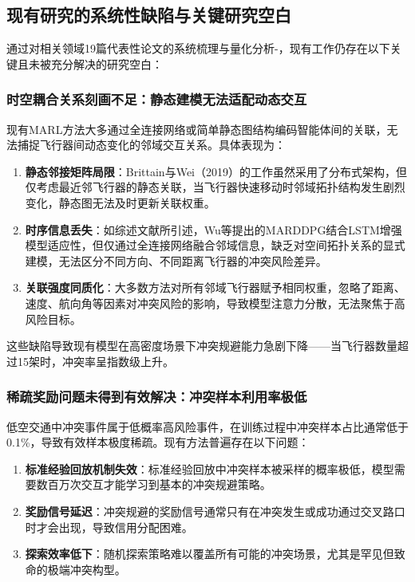 \documentclass[12pt,a4paper,UTF8]{ctexart}
\begin{document}
\subsection{现有研究的系统性缺陷与关键研究空白}
通过对相关领域19篇代表性论文的系统梳理与量化分析\cite{ref1}-\cite{ref19}，现有工作仍存在以下关键且未被充分解决的研究空白：

\subsubsection{时空耦合关系刻画不足：静态建模无法适配动态交互}
现有MARL方法大多通过全连接网络或简单静态图结构编码智能体间的关联，无法捕捉飞行器间动态变化的邻域交互关系。具体表现为：
\begin{enumerate}[label=(\arabic*)]
    \item \textbf{静态邻接矩阵局限}：Brittain与Wei（2019）的工作虽然采用了分布式架构，但仅考虑最近邻飞行器的静态关联，当飞行器快速移动时邻域拓扑结构发生剧烈变化，静态图无法及时更新关联权重\cite{ref12}。
    \item \textbf{时序信息丢失}：如综述文献\cite{ref8}所引述，Wu等提出的MARDDPG结合LSTM增强模型适应性，但仅通过全连接网络融合邻域信息，缺乏对空间拓扑关系的显式建模，无法区分不同方向、不同距离飞行器的冲突风险差异。
    \item \textbf{关联强度同质化}：大多数方法对所有邻域飞行器赋予相同权重，忽略了距离、速度、航向角等因素对冲突风险的影响，导致模型注意力分散，无法聚焦于高风险目标。
\end{enumerate}
这些缺陷导致现有模型在高密度场景下冲突规避能力急剧下降——当飞行器数量超过15架时，冲突率呈指数级上升。

\subsubsection{稀疏奖励问题未得到有效解决：冲突样本利用率极低}
低空交通中冲突事件属于低概率高风险事件，在训练过程中冲突样本占比通常低于0.1\%，导致有效样本极度稀疏。现有方法普遍存在以下问题：
\begin{enumerate}[label=(\arabic*)]
    \item \textbf{标准经验回放机制失效}：标准经验回放中冲突样本被采样的概率极低，模型需要数百万次交互才能学习到基本的冲突规避策略。
    \item \textbf{奖励信号延迟}：冲突规避的奖励信号通常只有在冲突发生或成功通过交叉路口时才会出现，导致信用分配困难。
    \item \textbf{探索效率低下}：随机探索策略难以覆盖所有可能的冲突场景，尤其是罕见但致命的极端冲突构型。
\end{enumerate}
\end{document}
